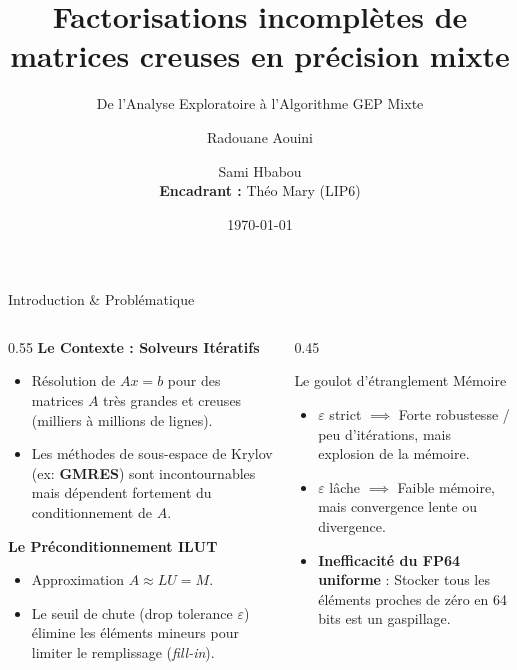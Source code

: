 \documentclass[10pt,aspectratio=169]{beamer}
\title[\textbf{Factorisations Incomplètes en Précision Mixte}]{\textbf{Factorisations incomplètes de matrices creuses en précision mixte}}
\subtitle{De l'Analyse Exploratoire à l'Algorithme GEP Mixte}
\author[R. Aouini \& S. Hbabou]{Radouane Aouini \and Sami Hbabou \\ \vspace{0.15cm} \small \textbf{Encadrant :} Théo Mary (LIP6)}
\institute[CCA]{Cryptologie, Calcul haute-performance et Algorithmique (CCA) -- Année Académique 2025-2026}
\date{\today}
\begin{document}
\begin{frame}[plain]
    \titlepage
\end{frame}

\begin{frame}{Introduction \& Problématique}
    \begin{columns}
        \begin{column}{0.55\textwidth}
            \textbf{Le Contexte : Solveurs Itératifs}
            \begin{itemize}
                \item Résolution de $Ax = b$ pour des matrices $A$ très grandes et creuses (milliers à millions de lignes).
                \item Les méthodes de sous-espace de Krylov (ex: \textbf{GMRES}) sont incontournables mais dépendent fortement du conditionnement de $A$.
            \end{itemize}
            \vspace{0.3cm}
            \textbf{Le Préconditionnement ILUT}
            \begin{itemize}
                \item Approximation $A \approx LU = M$.
                \item Le seuil de chute (drop tolerance $\varepsilon$) élimine les éléments mineurs pour limiter le remplissage (\textit{fill-in}).
            \end{itemize}
        \end{column}
        
        \begin{column}{0.45\textwidth}
            \begin{block}{Le goulot d'étranglement Mémoire}
                \begin{itemize}
                    \item $\varepsilon$ strict $\implies$ Forte robustesse / peu d'itérations, mais explosion de la mémoire.
                    \item $\varepsilon$ lâche $\implies$ Faible mémoire, mais convergence lente ou divergence.
                    \item \textbf{Inefficacité du FP64 uniforme} : Stocker tous les éléments proches de zéro en 64 bits est un gaspillage.
                \end{itemize}
            \end{block}
        \end{column}
    \end{columns}
\end{frame}
\end{document}

